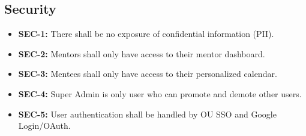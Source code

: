 \subsection{Security}

\begin{itemize}
    \item \textbf{SEC-1:} There shall be no exposure of confidential information
    (PII).
    
    \item \textbf{SEC-2:} Mentors shall only have access to their mentor
    dashboard.
    
    \item \textbf{SEC-3:} Mentees shall only have access to their personalized
    calendar.
    
    \item \textbf{SEC-4:} Super Admin is only user who can promote and demote
    other users.
    
    \item \textbf{SEC-5:} User authentication shall be handled by OU SSO and
    Google Login/OAuth.
\end{itemize}
